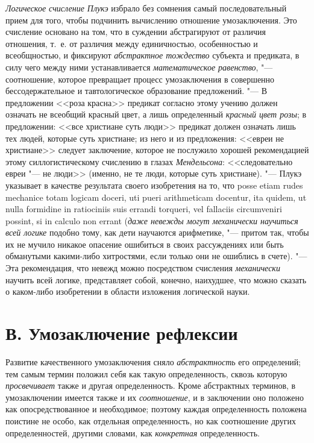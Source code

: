 {{{\em Логическое счисление Плукэ}
избрало без сомнения самый последовательный прием для того,
чтобы подчинить вычислению отношение умозаключения. Это счисление основано
на том, что в суждении абстрагируют от различия отношения, т.~е. от
различия между единичностью, особенностью и всеобщностью, и фиксируют
{\em абстрактное тождество}
субъекта и предиката, в силу чего между ними устанавливается
{\em математическое равенство}, "---
соотношение, которое превращает процесс умозаключения в
совершенно бессодержательное и тавтологическое образование предложений. "---
В предложении <<роза красна>> предикат согласно этому учению
должен означать не всеобщий красный цвет, а лишь определенный
{\em красный цвет розы};
в предложении: <<все христиане суть люди>> предикат должен
означать лишь тех людей, которые суть христиане; из него и из предложения:
<<евреи не христиане>> следует заключение, которое не послужило хорошей
рекомендацией этому силлогистическому счислению в глазах
{\em Мендельсона}:
<<следовательно евреи "--- не люди>> (именно, не те
люди, которые суть христиане). "--- Плукэ указывает в качестве
результата своего изобретения на то, что posse etiam rudes mechanice totam
logicam doceri, uti pueri arithmeticam docentur, ita quidem, ut nulla
formidine in ratiociniis suis errandi torqueri, vel fallaciis circumveniri
possint, si in calculo non errant
({\em даже невежды могут механически
научиться всей логике} подобно тому, как дети научаются
арифметике, "--- притом так, чтобы их не мучило никакое
опасение ошибиться в своих рассуждениях или быть обманутыми какими-либо
хитростями, если только они не ошиблись в счете). "--- Эта
рекомендация, что невежд можно посредством счисления
{\em механически} научить
всей логике, представляет собой, конечно, наихудшее, что
можно сказать о каком-либо изобретении в области изложения логической
науки.

\section[В. Умозаключение рефлексии]{В. Умозаключение рефлексии}
Развитие качественного умозаключения сняло
{\em абстрактность} его
определений; тем самым термин положил себя как такую определенность, сквозь
которую {\em просвечивает}
также и другая определенность. Кроме абстрактных терминов, в
умозаключении имеется также и их
{\em соотношение}, и в
заключении оно положено как опосредствованное и необходимое; поэтому каждая
определенность положена поистине не особо, как отдельная определенность, но
как соотношение других определенностей, другими словами, как
{\em конкретная} определенность.

}}

